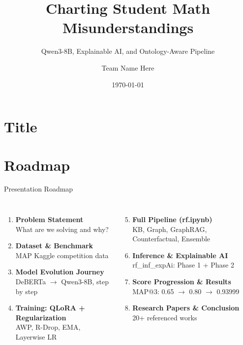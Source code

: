 ﻿\documentclass[aspectratio=169,10pt]{beamer}
\title{Charting Student Math Misunderstandings}
\subtitle{Qwen3-8B, Explainable AI, and Ontology-Aware Pipeline}
\author[ML Project Team]{Team Name Here}
\institute{CSE 330 --- Machine Learning Sessional $\mid$ Final Evaluation}
\date{\today}
\begin{document}

\section{Title}
\begin{frame}
  \titlepage
\end{frame}

\section{Roadmap}
\begin{frame}{Presentation Roadmap}
\small
\begin{columns}[T]
\begin{enumerate}
  \item \textbf{Problem Statement}\\{\scriptsize What are we solving and why?}
  \vspace{4pt}
  \item \textbf{Dataset \& Benchmark}\\{\scriptsize MAP Kaggle competition data}
  \vspace{4pt}
  \item \textbf{Model Evolution Journey}\\{\scriptsize DeBERTa $\rightarrow$ Qwen3-8B, step by step}
  \vspace{4pt}
  \item \textbf{Training: QLoRA + Regularization}\\{\scriptsize AWP, R-Drop, EMA, Layerwise LR}
\end{enumerate}
\begin{enumerate}
  \setcounter{enumi}{4}
  \item \textbf{Full Pipeline (rf.ipynb)}\\{\scriptsize KB, Graph, GraphRAG, Counterfactual, Ensemble}
  \vspace{4pt}
  \item \textbf{Inference \& Explainable AI}\\{\scriptsize rf\_inf\_expAi: Phase 1 + Phase 2}
  \vspace{4pt}
  \item \textbf{Score Progression \& Results}\\{\scriptsize MAP@3: 0.65 $\rightarrow$ 0.80 $\rightarrow$ 0.93999}
  \vspace{4pt}
  \item \textbf{Research Papers \& Conclusion}\\{\scriptsize 20+ referenced works}
\end{enumerate}
\end{columns}
\end{frame}
\end{document}
